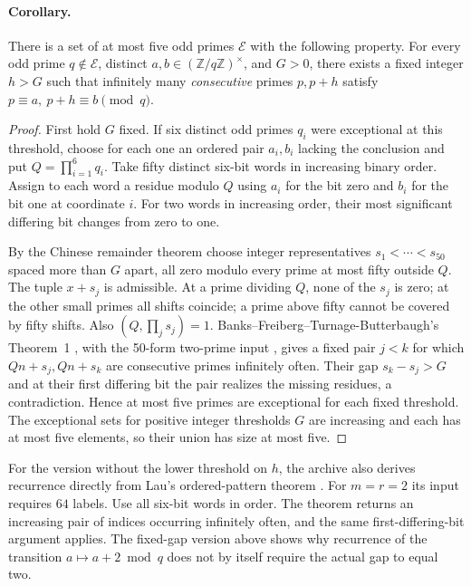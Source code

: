 \documentclass[11pt]{article}
\begin{document}
\paragraph{Corollary.}
There is a set of at most five odd primes \(\mathcal E\) with the
following property. For every odd prime \(q\notin\mathcal E\), distinct
\(a,b\in(\mathbb Z/q\mathbb Z)^\times\), and \(G>0\), there exists a
fixed integer \(h>G\) such that infinitely many \emph{consecutive}
primes \(p,p+h\) satisfy \(p\equiv a,\ p+h\equiv b\pmod q\).

\begin{proof}
First hold \(G\) fixed. If six distinct odd primes \(q_i\) were exceptional
at this threshold, choose for each one an ordered pair \(a_i,b_i\) lacking
the conclusion and put \(Q=\prod_{i=1}^6q_i\).
Take fifty distinct six-bit words in increasing binary order. Assign
to each word a residue modulo \(Q\) using \(a_i\) for the bit zero and
\(b_i\) for the bit one at coordinate \(i\). For two words in increasing
order, their most significant differing bit changes from zero to one.

By the Chinese remainder theorem choose integer representatives
\(s_1<\cdots<s_{50}\) spaced more than \(G\) apart, all zero modulo
every prime at most fifty outside \(Q\). The tuple \(x+s_j\) is
admissible. At a prime dividing \(Q\), none of the \(s_j\) is zero;
at the other small primes all shifts coincide; a prime above fifty
cannot be covered by fifty shifts. Also \((Q,\prod_js_j)=1\).
Banks--Freiberg--Turnage-Butterbaugh's Theorem~1 \cite{BFTB}, with the
50-form two-prime input \cite{Polymath}, gives a fixed pair \(j<k\)
for which \(Qn+s_j,Qn+s_k\) are consecutive primes infinitely often.
Their gap \(s_k-s_j>G\) and at their first differing bit the pair realizes
the missing residues, a contradiction. Hence at most five primes are
exceptional for each fixed threshold. The exceptional sets for positive
integer thresholds \(G\) are increasing and each has at most five
elements, so their union has size at most five.
\end{proof}

For the version without the lower threshold on \(h\), the archive
also derives recurrence directly from Lau's ordered-pattern theorem
\cite[Definition 1.4 and Theorem 1.5, v2]{Lau}. For \(m=r=2\) its input
requires \(64\) labels. Use all six-bit words in order. The theorem
returns an increasing pair of indices occurring infinitely often, and
the same first-differing-bit argument applies. The fixed-gap version
above shows why recurrence of the transition \(a\mapsto a+2\bmod q\)
does not by itself require the actual gap to equal two.
\end{document}
